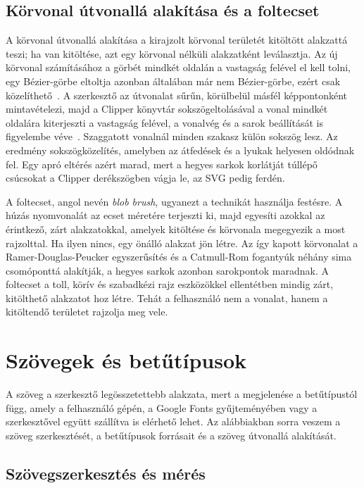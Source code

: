 
\subsection{Körvonal útvonallá alakítása és a foltecset}

A körvonal útvonallá alakítása a kirajzolt körvonal területét kitöltött alakzattá teszi; ha van kitöltése, azt egy körvonal nélküli alakzatként leválasztja. Az új körvonal számításához a görbét mindkét oldalán a vastagság felével el kell tolni, egy Bézier-görbe eltoltja azonban általában már nem Bézier-görbe, ezért csak közelíthető~\cite{elber1997}. A szerkesztő az útvonalat sűrűn, körülbelül másfél képpontonként mintavételezi, majd a Clipper könyvtár sokszögeltolásával a vonal mindkét oldalára kiterjeszti a vastagság felével, a vonalvég és a sarok beállítását is figyelembe véve~\cite{clipper}. Szaggatott vonalnál minden szakasz külön sokszög lesz. Az eredmény sokszögközelítés, amelyben az átfedések és a lyukak helyesen oldódnak fel. Egy apró eltérés azért marad, mert a hegyes sarkok korlátját túllépő csúcsokat a Clipper derékszögben vágja le, az SVG pedig ferdén.

A foltecset, angol nevén \textit{blob brush}, ugyanezt a technikát használja festésre. A húzás nyomvonalát az ecset méretére terjeszti ki, majd egyesíti azokkal az érintkező, zárt alakzatokkal, amelyek kitöltése és körvonala megegyezik a most rajzolttal. Ha ilyen nincs, egy önálló alakzat jön létre. Az így kapott körvonalat a Ramer-Douglas-Peucker egyszerűsítés és a Catmull-Rom fogantyúk néhány sima csomóponttá alakítják, a hegyes sarkok azonban sarokpontok maradnak. A foltecset a toll, körív és szabadkézi rajz eszközökkel ellentétben mindig zárt, kitölthető alakzatot hoz létre. Tehát a felhasználó nem a vonalat, hanem a kitöltendő területet rajzolja meg vele.


\section{Szövegek és betűtípusok}
\label{sec:text_impl}

A szöveg a szerkesztő legösszetettebb alakzata, mert a megjelenése a betűtípustól függ, amely a felhasználó gépén, a Google Fonts gyűjteményében vagy a szerkesztővel együtt szállítva is elérhető lehet. Az alábbiakban sorra veszem a szöveg szerkesztését, a betűtípusok forrásait és a szöveg útvonallá alakítását.

\subsection{Szövegszerkesztés és mérés}

